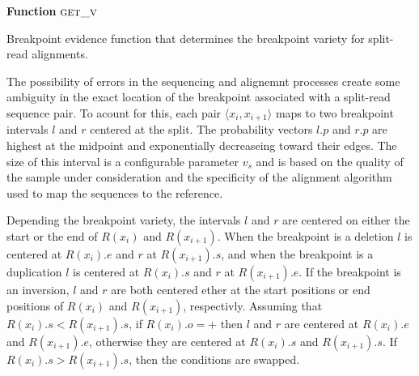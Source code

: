 \documentclass[11pt]{article}
\begin{document}
\begin{algorithm}[H]
    \DontPrintSemicolon
    \footnotesize
    \BlankLine
    \textbf{Function} $\textsc{get\_v}$\;
	\caption{Breakpoint evidence function that determines the breakpoint variety
			 for split-read alignments.}
    \label{get_v_sr}
\end{algorithm}

The possibility of errors in the sequencing and alignemnt processes create some
ambiguity in the exact location of the breakpoint associated with a split-read
sequence pair.  To acount for this, each pair $\langle x_i, x_{i+1} \rangle$
maps to two breakpoint intervals $l$ and $r$ centered at the split. The 
probability vectors $l.p$ and $r.p$ are highest at the midpoint and
exponentially decreaseing toward their edges.  The size of this interval is a
configurable parameter $v_s$ and is based on the quality of the sample under
consideration and the specificity of the alignment algorithm used to map the
sequences to the reference.

Depending the breakpoint variety, the intervals $l$ and $r$ are centered on
either the start or the end of $R(x_i)$ and $R(x_{i+1})$.  When the breakpoint
is a deletion $l$ is centered at $R(x_i).e$ and $r$ at $R(x_{i+1}).s$, and when
the breakpoint is a duplication $l$ is centered at $R(x_i).s$ and $r$ at
$R(x_{i+1}).e$.  If the breakpoint is an inversion, $l$ and $r$ are both 
centered ether at the start positions or end positions of $R(x_i)$ and
$R(x_{i+1})$, respectivly.  Assuming that $R(x_i).s<R(x_{i+1}).s$, if
$R(x_i).o=+$ then $l$ and $r$ are centered at $R(x_i).e$ and  $R(x_{i+1}).e$,
otherwise they are centered at $R(x_i).s$ and  $R(x_{i+1}).s$.  If
$R(x_i).s>R(x_{i+1}).s$, then the conditions are swapped.
\end{document}
